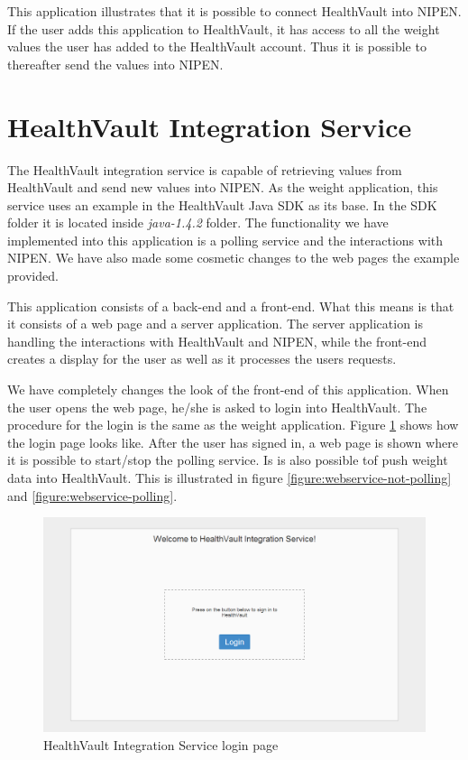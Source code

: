 This application illustrates that it is possible to connect HealthVault into NIPEN.
If the user adds this application to HealthVault, it has access to all the weight values the user has added to the HealthVault account.
Thus it is possible to thereafter send the values into NIPEN.

\section{HealthVault Integration Service}

The HealthVault integration service is capable of retrieving values from HealthVault and send new values into NIPEN. 
As the weight application, this service uses an example in the HealthVault Java SDK \cite{HealthVaultSDK} as its base.
In the SDK folder it is located inside \textit{java-1.4.2} folder.
The functionality we have implemented into this application is a polling service and the interactions with NIPEN.
We have also made some cosmetic changes to the web pages the example provided.

This application consists of a back-end and a front-end.
What this means is that it consists of a web page and a server application.
The server application is handling the interactions with HealthVault and NIPEN, while the front-end creates a display for the user as well as it processes the users requests.

We have completely changes the look of the front-end of this application.
When the user opens the web page, he/she is asked to login into HealthVault.
The procedure for the login is the same as the weight application.
Figure \ref{figure:webservice-login} shows how the login page looks like.
After the user has signed in, a web page is shown where it is possible to start/stop the polling service.
Is is also possible tof push weight data into HealthVault. 
This is illustrated in figure \ref{figure:webservice-not-polling} and \ref{figure:webservice-polling}.

\begin{figure}[H]
\centering
\includegraphics[scale=0.4]{../Figures/webservice-login.png}
\caption{HealthVault Integration Service login page}
\label{figure:webservice-login}
\end{figure}


